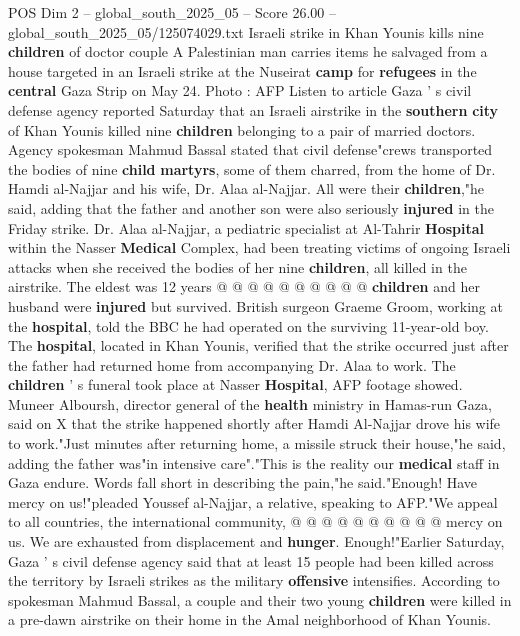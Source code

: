 \begin{textsample}{POS Dim 2 – global\_south\_2025\_05 – Score 26.00 – global\_south\_2025\_05/125074029.txt}  \label{ex:f2_pos_050}
Israeli strike in Khan Younis kills nine \textbf{children} of doctor couple A Palestinian man carries items he salvaged from a house targeted in an Israeli strike at the Nuseirat \textbf{camp} for \textbf{refugees} in the \textbf{central} Gaza Strip on May 24.
Photo : AFP Listen to article Gaza ' s civil defense agency reported Saturday that an Israeli airstrike in the \textbf{southern} \textbf{city} of Khan Younis killed nine \textbf{children} belonging to a pair of married doctors.
Agency spokesman Mahmud Bassal stated that civil defense"crews transported the bodies of nine \textbf{child} \textbf{martyrs}, some of them charred, from the home of Dr.
Hamdi al-Najjar and his wife, Dr.
Alaa al-Najjar.
All were their \textbf{children},"he said, adding that the father and another son were also seriously \textbf{injured} in the Friday strike.
Dr.
Alaa al-Najjar, a pediatric specialist at Al-Tahrir \textbf{Hospital} within the Nasser \textbf{Medical} Complex, had been treating victims of ongoing Israeli attacks when she received the bodies of her nine \textbf{children}, all killed in the airstrike.
The eldest was 12 years @ @ @ @ @ @ @ @ @ @ \textbf{children} and her husband were \textbf{injured} but survived.
British surgeon Graeme Groom, working at the \textbf{hospital}, told the BBC he had operated on the surviving 11-year-old boy.
The \textbf{hospital}, located in Khan Younis, verified that the strike occurred just after the father had returned home from accompanying Dr.
Alaa to work.
The \textbf{children} ' s funeral took place at Nasser \textbf{Hospital}, AFP footage showed.
Muneer Alboursh, director general of the \textbf{health} ministry in Hamas-run Gaza, said on X that the strike happened shortly after Hamdi Al-Najjar drove his wife to work."Just minutes after returning home, a missile struck their house,"he said, adding the father was"in intensive care"."This is the reality our \textbf{medical} staff in Gaza endure.
Words fall short in describing the pain,"he said."Enough!
Have mercy on us!"pleaded Youssef al-Najjar, a relative, speaking to AFP."We appeal to all countries, the international community, @ @ @ @ @ @ @ @ @ @ mercy on us.
We are exhausted from displacement and \textbf{hunger}.
Enough!"Earlier Saturday, Gaza ' s civil defense agency said that at least 15 people had been killed across the territory by Israeli strikes as the military \textbf{offensive} intensifies.
According to spokesman Mahmud Bassal, a couple and their two young \textbf{children} were killed in a pre-dawn airstrike on their home in the Amal neighborhood of Khan Younis.

\end{textsample}
